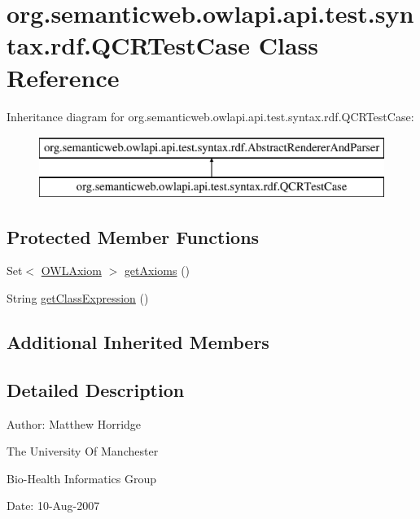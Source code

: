 \hypertarget{classorg_1_1semanticweb_1_1owlapi_1_1api_1_1test_1_1syntax_1_1rdf_1_1_q_c_r_test_case}{\section{org.\-semanticweb.\-owlapi.\-api.\-test.\-syntax.\-rdf.\-Q\-C\-R\-Test\-Case Class Reference}
\label{classorg_1_1semanticweb_1_1owlapi_1_1api_1_1test_1_1syntax_1_1rdf_1_1_q_c_r_test_case}
}
Inheritance diagram for org.\-semanticweb.\-owlapi.\-api.\-test.\-syntax.\-rdf.\-Q\-C\-R\-Test\-Case\-:\begin{figure}[H]
\begin{center}
\leavevmode
\includegraphics[height=2.000000cm]{classorg_1_1semanticweb_1_1owlapi_1_1api_1_1test_1_1syntax_1_1rdf_1_1_q_c_r_test_case}
\end{center}
\end{figure}
\subsection*{Protected Member Functions}
\begin{DoxyCompactItemize}
\item 
Set$<$ \hyperlink{interfaceorg_1_1semanticweb_1_1owlapi_1_1model_1_1_o_w_l_axiom}{O\-W\-L\-Axiom} $>$ \hyperlink{classorg_1_1semanticweb_1_1owlapi_1_1api_1_1test_1_1syntax_1_1rdf_1_1_q_c_r_test_case_a2caad78ee532459b9fc32e5931cda146}{get\-Axioms} ()
\item 
String \hyperlink{classorg_1_1semanticweb_1_1owlapi_1_1api_1_1test_1_1syntax_1_1rdf_1_1_q_c_r_test_case_ac7533345f5a1b268a51e9c4442232484}{get\-Class\-Expression} ()
\end{DoxyCompactItemize}
\subsection*{Additional Inherited Members}


\subsection{Detailed Description}
Author\-: Matthew Horridge\par
 The University Of Manchester\par
 Bio-\/\-Health Informatics Group\par
 Date\-: 10-\/\-Aug-\/2007\par
 \par
 

